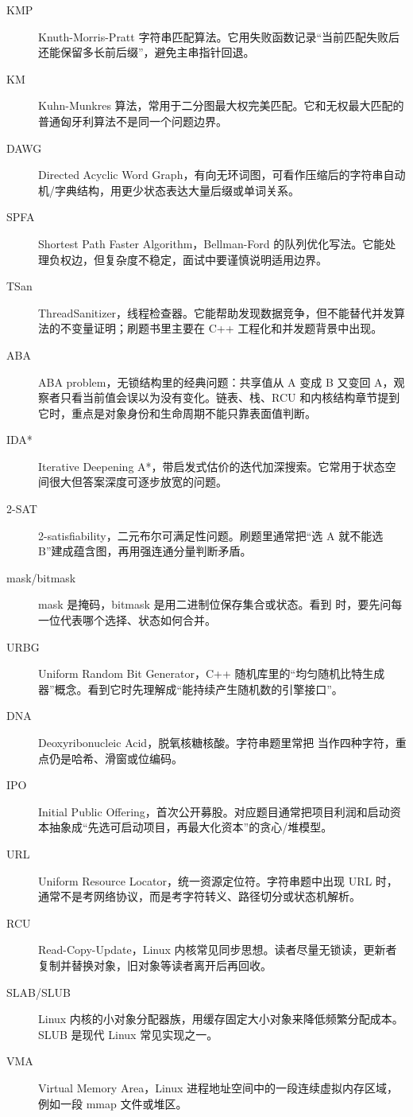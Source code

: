 \begin{description}
  \item[KMP] Knuth-Morris-Pratt 字符串匹配算法。它用失败函数记录“当前匹配失败后还能保留多长前后缀”，避免主串指针回退。
  \item[KM] Kuhn-Munkres 算法，常用于二分图最大权完美匹配。它和无权最大匹配的普通匈牙利算法不是同一个问题边界。
  \item[DAWG] Directed Acyclic Word Graph，有向无环词图，可看作压缩后的字符串自动机/字典结构，用更少状态表达大量后缀或单词关系。
  \item[SPFA] Shortest Path Faster Algorithm，Bellman-Ford 的队列优化写法。它能处理负权边，但复杂度不稳定，面试中要谨慎说明适用边界。
  \item[TSan] ThreadSanitizer，线程检查器。它能帮助发现数据竞争，但不能替代并发算法的不变量证明；刷题书里主要在 C++ 工程化和并发题背景中出现。
  \item[ABA] ABA problem，无锁结构里的经典问题：共享值从 A 变成 B 又变回 A，观察者只看当前值会误以为没有变化。链表、栈、RCU 和内核结构章节提到它时，重点是对象身份和生命周期不能只靠表面值判断。
  \item[IDA*] Iterative Deepening A*，带启发式估价的迭代加深搜索。它常用于状态空间很大但答案深度可逐步放宽的问题。
  \item[2-SAT] 2-satisfiability，二元布尔可满足性问题。刷题里通常把“选 A 就不能选 B”建成蕴含图，再用强连通分量判断矛盾。
  \item[mask/bitmask] mask 是掩码，bitmask 是用二进制位保存集合或状态。看到  时，要先问每一位代表哪个选择、状态如何合并。
  \item[URBG] Uniform Random Bit Generator，C++ 随机库里的“均匀随机比特生成器”概念。看到它时先理解成“能持续产生随机数的引擎接口”。
  \item[DNA] Deoxyribonucleic Acid，脱氧核糖核酸。字符串题里常把  当作四种字符，重点仍是哈希、滑窗或位编码。
  \item[IPO] Initial Public Offering，首次公开募股。对应题目通常把项目利润和启动资本抽象成“先选可启动项目，再最大化资本”的贪心/堆模型。
  \item[URL] Uniform Resource Locator，统一资源定位符。字符串题中出现 URL 时，通常不是考网络协议，而是考字符转义、路径切分或状态机解析。
  \item[RCU] Read-Copy-Update，Linux 内核常见同步思想。读者尽量无锁读，更新者复制并替换对象，旧对象等读者离开后再回收。
  \item[SLAB/SLUB] Linux 内核的小对象分配器族，用缓存固定大小对象来降低频繁分配成本。SLUB 是现代 Linux 常见实现之一。
  \item[VMA] Virtual Memory Area，Linux 进程地址空间中的一段连续虚拟内存区域，例如一段 mmap 文件或堆区。

\end{description}
